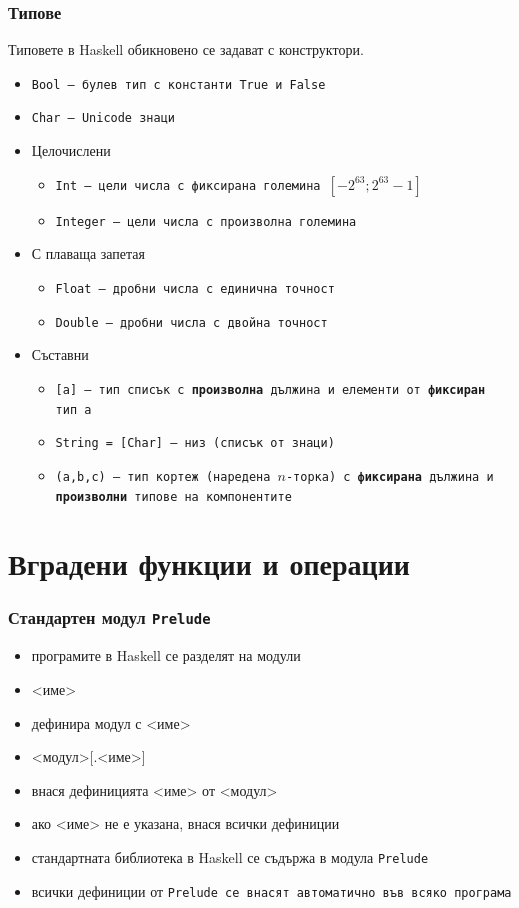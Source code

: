 \documentclass{beamer}
\begin{document}
\begin{frame}
  \frametitle{Типове}
  Типовете в Haskell обикновено се задават с конструктори. \pause
  \begin{itemize}[<+->]
  \item \tt{Bool} --- булев тип с константи \tt{True} и \tt{False}
  \item \tt{Char} --- Unicode знаци
  \item Целочислени
    \begin{itemize}
    \item \tt{Int} --- цели числа с фиксирана големина $[-2^{63}; 2^{63}-1]$
    \item \tt{Integer} --- цели числа с произволна големина
    \end{itemize}
  \item С плаваща запетая
    \begin{itemize}
    \item \tt{Float} --- дробни числа с единична точност
    \item \tt{Double} --- дробни числа с двойна точност
    \end{itemize}
  \item Съставни
    \begin{itemize}
    \item \tt{[a]} --- тип списък с \textbf{произволна} дължина и
      елементи от \textbf{фиксиран} тип \tt a
    \item \tt{String = [Char]} --- низ (списък от знаци)
    \item \tt{(a,b,c)} --- тип кортеж (наредена $n$-торка) с
      \textbf{фиксирана} дължина и \textbf{произволни} типове на
      компонентите
    \end{itemize}
  \end{itemize}
\end{frame}

\section{Вградени функции и операции}

\begin{frame}
  \frametitle{Стандартен модул \tt{Prelude}}
  \begin{itemize}[<+->]
  \item програмите в Haskell се разделят на модули
  \item {} <име> 
  \item дефинира модул с <име>
  \item {} <модул>[\tta.<име>]
  \item внася дефиницията <име> от <модул>
  \item ако <име> не е указана, внася всички дефиниции
  \item стандартната библиотека в Haskell се съдържа в модула \tt{Prelude}
  \item всички дефиниции от \tt{Prelude} се внасят автоматично във всяко програма
  \end{itemize}
\end{frame}
\end{document}
